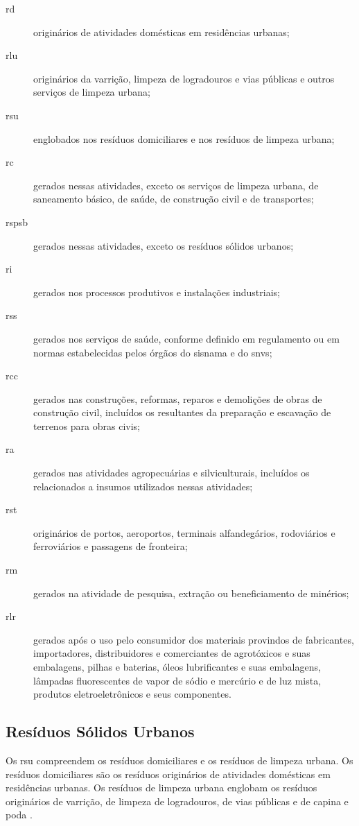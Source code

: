	\begin{description}
		\item[\gls{rd}] originários de atividades domésticas em residências urbanas;
		\item[\gls{rlu}] originários da varrição, limpeza de logradouros e vias públicas e outros serviços de limpeza urbana;
		\item[\gls{rsu}] englobados nos resíduos domiciliares e nos resíduos de limpeza urbana;
		\item[\gls{rc}] gerados nessas atividades, exceto os serviços de limpeza urbana, de saneamento básico, de saúde, de construção civil e de transportes;
		\item[\gls{rspsb}] gerados nessas atividades, exceto os resíduos sólidos urbanos;
		\item[\gls{ri}] gerados nos processos produtivos e instalações industriais;
		\item[\gls{rss}] gerados nos serviços de saúde, conforme definido em regulamento ou em normas estabelecidas pelos órgãos do \gls{sisnama} e do \gls{snvs};
		\item[\gls{rcc}] gerados nas construções, reformas, reparos e demolições de obras de construção civil, incluídos os resultantes da preparação e escavação de terrenos para obras civis;
		\item[\gls{ra}] gerados nas atividades agropecuárias e silviculturais, incluídos os relacionados a insumos utilizados nessas atividades;
		\item[\gls{rst}] originários de portos, aeroportos, terminais alfandegários, rodoviários e ferroviários e passagens de fronteira;
		\item[\gls{rm}] gerados na atividade de pesquisa, extração ou beneficiamento de minérios;
		\item[\gls{rlr}] gerados após o uso pelo consumidor dos materiais provindos de fabricantes, importadores, distribuidores e comerciantes de agrotóxicos e suas embalagens, pilhas e baterias, óleos lubrificantes e suas embalagens, lâmpadas fluorescentes de vapor de sódio e mercúrio e de luz mista, produtos eletroeletrônicos e seus componentes.
		
	\end{description}
	
	\subsection{Resíduos Sólidos Urbanos}
	Os \gls{rsu} compreendem os resíduos domiciliares e os resíduos de limpeza urbana. Os resíduos domiciliares são os resíduos originários de atividades domésticas em residências urbanas. Os resíduos de limpeza urbana englobam os resíduos originários de varrição, de limpeza de logradouros, de vias públicas e de capina e poda \cite{brasil:12305, brasil:11445}.
	

